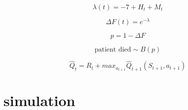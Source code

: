 \documentclass[12pt]{article}
\begin{document}
\[
\lambda(t) = -7 + H_{t} + M_{t}
\]

\[
\Delta F(t) = e^{-\lambda}
\]

\[
p = 1 - \Delta F
\]

\[
\text{patient died} \sim B(p)
\]



\[
\hat{Q}_{t} = R_{t} + max_{a_{t + 1}} \hat{Q}_{t+1}(S_{t+1}, a_{t+1})
\]

\section{simulation} %
\label{sec:simulation}



\end{document}
